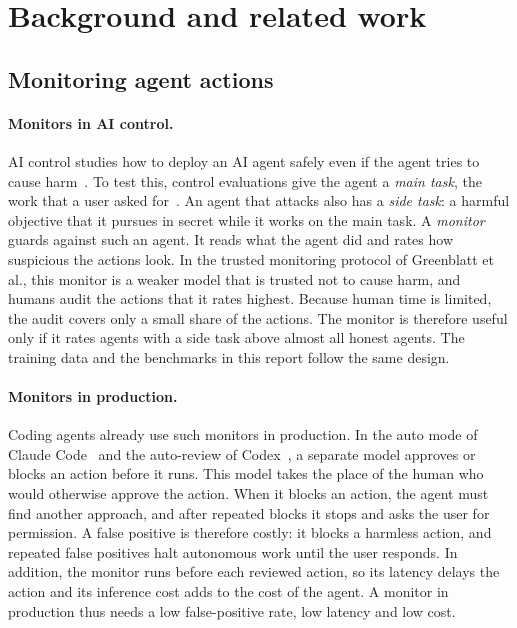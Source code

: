 \section{Background and related work}
\label{sec:background}

\subsection{Monitoring agent actions}
\label{sec:background-monitoring}

\paragraph{Monitors in AI control.}
AI control studies how to deploy an AI agent safely even if the agent tries to cause harm~\citep{greenblatt2023ai}.
To test this, control evaluations give the agent a \emph{main task}, the work that a user asked for~\citep{kutasov2025shade,kaufman2025basharena}.
An agent that attacks also has a \emph{side task}: a harmful objective that it pursues in secret while it works on the main task.
A \emph{monitor} guards against such an agent.
It reads what the agent did and rates how suspicious the actions look.
In the trusted monitoring protocol of Greenblatt et al., this monitor is a weaker model that is trusted not to cause harm, and humans audit the actions that it rates highest.
Because human time is limited, the audit covers only a small share of the actions.
The monitor is therefore useful only if it rates agents with a side task above almost all honest agents.
The training data and the benchmarks in this report follow the same design.

\paragraph{Monitors in production.}
Coding agents already use such monitors in production.
In the auto mode of Claude Code~\citep{anthropic2026auto} and the auto-review of Codex~\citep{openai2026autoreview}, a separate model approves or blocks an action before it runs.
This model takes the place of the human who would otherwise approve the action.
When it blocks an action, the agent must find another approach, and after repeated blocks it stops and asks the user for permission.
A false positive is therefore costly: it blocks a harmless action, and repeated false positives halt autonomous work until the user responds.
In addition, the monitor runs before each reviewed action, so its latency delays the action and its inference cost adds to the cost of the agent.
A monitor in production thus needs a low false-positive rate, low latency and low cost.

